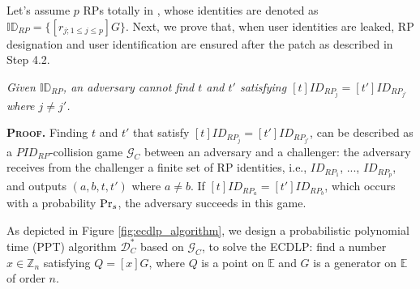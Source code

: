 Let's assume $p$ RPs totally in \usso,
    whose identities are denoted as $\mathbb{ID}_{RP} = \{[r_{j; 1 \leq j \leq p}]G\}$.
Next, we prove that, when user identities are leaked,
    RP designation and user identification are ensured after the patch as described in Step 4.2.

\vspace{-1mm}
\begin{lemma}
\emph{Given $\mathbb{ID}_{RP}$, an adversary cannot find $t$ and $t'$ satisfying $[t]ID_{RP_j} = [t']ID_{RP_{j'}}$ where $j \neq j'$.}\label{thm-rp-collision}
\end{lemma}
\vspace{-1mm}

\noindent\textbf{\textsc{Proof.}} 
Finding $t$ and $t'$ that satisfy $[t]ID_{RP_j} = [t']ID_{RP_{j'}}$, can be described as a $PID_{RP}$-collision game $\mathcal{G}_C$ between an adversary and a challenger: the adversary receives from the challenger a finite set of RP identities, i.e., $ID_{RP_1}$, ..., $ID_{RP_p}$, and outputs $(a, b, t, t')$ where $a \neq b$. If $[t]ID_{RP_a}=[t']ID_{RP_b}$, which occurs with a probability ${\rm Pr}_s$, the adversary succeeds in this game.

As depicted in Figure \ref{fig:ecdlp_algorithm}, we design a probabilistic polynomial time (PPT) algorithm $\mathcal{D}^*_C$ based on $\mathcal{G}_C$, to solve the ECDLP: find a number $x \in \mathbb{Z}_n$ satisfying $Q = [x]G$, where $Q$ is a point on $\mathbb{E}$ and $G$ is a generator on $\mathbb{E}$ of order $n$.

